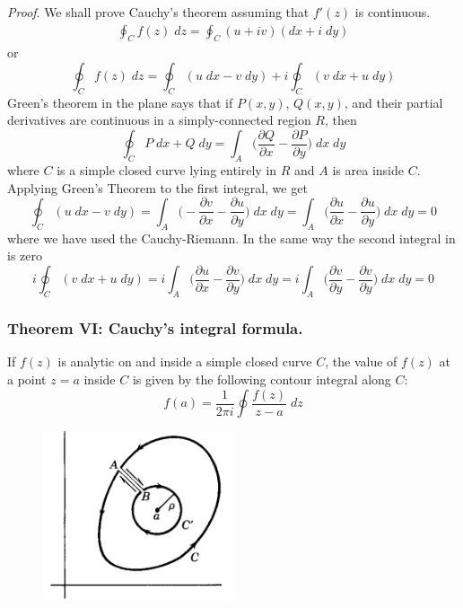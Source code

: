 \documentclass[../main.tex]{subfiles}
\begin{document}
\emph{Proof}. We shall prove Cauchy's theorem assuming that $f '(z)$ is continuous.
\begin{align*}
    \oint_C f(z) \;dz =\oint_C  (u + iv)(dx + i \;dy)
\end{align*}
or
\begin{equation*}
    \oint_C f(z) \;dz =\oint_C(u \;dx - v\; dy)+i\oint_C (v\; dx + u\; dy)
\end{equation*}
Green’s theorem in the plane says that if $P (x, y)$, $Q(x, y)$, and their partial derivatives are continuous in a simply-connected region $R$, then
\begin{equation*}
    \oint_C P\;dx+Q\;dy=\int_A \biggl(\frac{\partial Q}{\partial x}- \frac{\partial P}{\partial y}\biggr)\;dx\;dy
\end{equation*}
where $C$ is a simple closed curve lying entirely in $R$ and $A$ is area inside $C$. Applying Green's Theorem to the first integral, we get
\begin{equation*}
    \oint_C(u \;dx - v\; dy)=\int_A \biggl(-\frac{\partial v}{\partial x}- \frac{\partial u}{\partial y}\biggr)\;dx\;dy=\int_A \biggl(\frac{\partial u}{\partial x}- \frac{\partial u}{\partial y}\biggr)\;dx\;dy=0
\end{equation*}
where we have used the Cauchy-Riemann. In the same way the second integral in is zero
\begin{equation*}
    i\oint_C (v\; dx + u\; dy)=
    i\int_A \biggl(\frac{\partial u}{\partial x}- \frac{\partial v}{\partial y}\biggr)\;dx\;dy=
    i\int_A \biggl(\frac{\partial v}{\partial y}- \frac{\partial v}{\partial y}\biggr)\;dx\;dy=0
\end{equation*}

\subsubsection*{Theorem VI: Cauchy's integral formula.} If $f(z)$ is analytic on and inside a simple closed curve $C$, the value of $f(z)$ at a point $z = a$ inside $C$ is given by the following contour integral along $C$:
\begin{equation*}
    f(a)=\frac{1}{2\pi i}\oint \frac{f(z)}{z-a}\;dz
\end{equation*}
\begin{figure}[h]
    \centering
    \includegraphics[width=0.5\textwidth]{../Rss/Com/Theo.png}
\end{figure}
\end{document}
